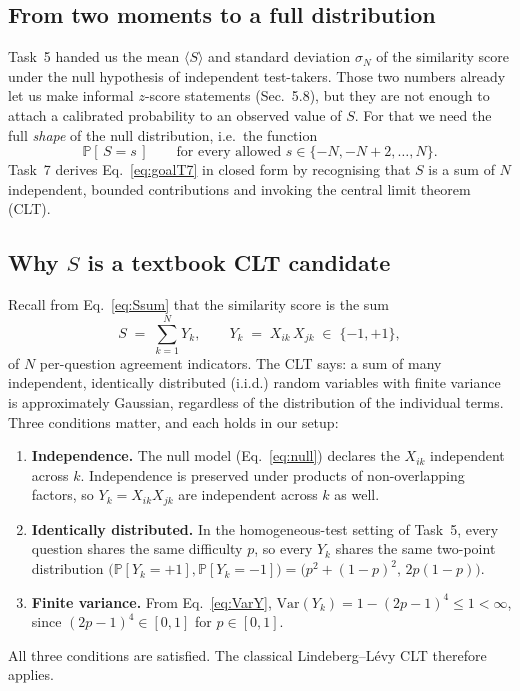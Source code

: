 \documentclass[11pt,a4paper]{article}
\newcommand{\Var}{\mathrm{Var}}
\renewcommand{\Pr}{\mathbb{P}}
\begin{document}
\subsection{From two moments to a full distribution}
Task~5 handed us the mean $\langle S\rangle$ and standard deviation
$\sigma_N$ of the similarity score under the null hypothesis of
independent test-takers. Those two numbers already let us make
informal $z$-score statements (Sec.~5.8), but they are not enough to
attach a calibrated probability to an observed value of $S$. For that
we need the full \emph{shape} of the null distribution, i.e.\ the
function
\begin{equation}
  \Pr[\,S = s\,]
  \qquad\text{for every allowed }s\in\{-N,-N+2,\ldots,N\}.
  \label{eq:goalT7}
\end{equation}
Task~7 derives Eq.~\eqref{eq:goalT7} in closed form by recognising
that $S$ is a sum of $N$ independent, bounded contributions and
invoking the central limit theorem (CLT).

\subsection{Why $S$ is a textbook CLT candidate}
Recall from Eq.~\eqref{eq:Ssum} that the similarity score is the sum
\begin{equation}
  S \;=\; \sum_{k=1}^{N} Y_k,
  \qquad
  Y_k \;=\; X_{ik}\,X_{jk}\;\in\;\{-1,+1\},
  \label{eq:Srecall}
\end{equation}
of $N$ per-question agreement indicators. The CLT says: a sum of
many independent, identically distributed (i.i.d.) random variables
with finite variance is approximately Gaussian, regardless of the
distribution of the individual terms. Three conditions matter, and
each holds in our setup:

\begin{insight}
\begin{enumerate}[leftmargin=2em,label=(\roman*),nosep]
  \item \textbf{Independence.} The null model
        (Eq.~\eqref{eq:null}) declares the $X_{ik}$ independent across
        $k$. Independence is preserved under products of
        non-overlapping factors, so
        $Y_k = X_{ik}X_{jk}$ are independent across $k$ as well.
  \item \textbf{Identically distributed.} In the homogeneous-test
        setting of Task~5, every question shares the same difficulty
        $p$, so every $Y_k$ shares the same two-point distribution
        $\bigl(\Pr[Y_k=+1],\Pr[Y_k=-1]\bigr) = \bigl(p^2+(1-p)^2,\,2p(1-p)\bigr)$.
  \item \textbf{Finite variance.} From Eq.~\eqref{eq:VarY},
        $\Var(Y_k) = 1 - (2p-1)^4 \leq 1 < \infty$, since
        $(2p-1)^4 \in [0,1]$ for $p\in[0,1]$.
\end{enumerate}
All three conditions are satisfied. The classical Lindeberg--Lévy
CLT therefore applies.
\end{insight}
\end{document}
